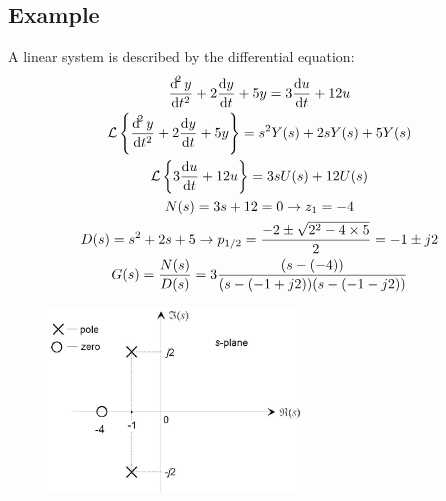 \documentclass[class=report, crop=false, 12pt,a4paper, tikz, border=4mm]{standalone}
\begin{document}
\subsection{Example}
A linear system is described by the differential equation:
\begin{gather}
  \frac{\dif^2y}{\dif t^2} + 2\frac{\dif y}{\dif t} + 5y = 3\frac{\dif u}{\dif t} + 12u\\
  \mathcal{L} \left\{ \frac{\dif^2y}{\dif t^2} + 2\frac{\dif y}{\dif t} + 5y \right\} = s^2 Y(s) + 2sY(s) + 5Y(s)\\
  \mathcal{L} \left\{ 3\frac{\dif u}{\dif t} + 12u \right\} = 3sU(s) + 12U(s)\\
  N(s) = 3s + 12 = 0 \rightarrow z_1 = -4\\
  D(s) = s^2 + 2s + 5 \rightarrow p_{1/2} = \frac{-2 \pm \sqrt{2^2 - 4\times 5}}{2} = -1 \pm j2\\
  G(s) = \frac{N(s)}{D(s)} = 3 \frac{(s-(-4))}{(s-(-1+j2))(s-(-1-j2))} 
\end{gather}
\begin{figure}[H]
  \centering
  \includegraphics[width = 0.6\textwidth]{../img/diagram35.png}
\end{figure}
\end{document}
